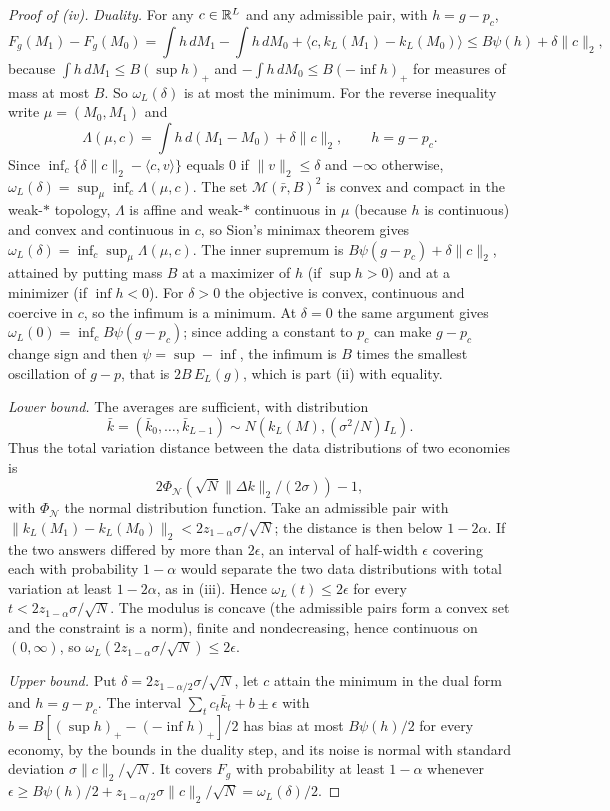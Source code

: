 \begin{proof}[Proof of (iv)]
\emph{Duality.} For any $c\in\mathbb{R}^L$ and any admissible pair, with $h=g-p_c$,
\[
F_g(M_1)-F_g(M_0)=\int h\,dM_1-\int h\,dM_0+\langle c,k_L(M_1)-k_L(M_0)\rangle\le B\psi(h)+\delta\|c\|_2,
\]
because $\int h\,dM_1\le B(\sup h)_+$ and $-\int h\,dM_0\le B(-\inf h)_+$ for measures of mass at most $B$. So $\omega_L(\delta)$ is at most the minimum. For the reverse inequality write $\mu=(M_0,M_1)$ and
\[
\Lambda(\mu,c)=\int h\,d(M_1-M_0)+\delta\|c\|_2,\qquad h=g-p_c .
\]
Since $\inf_c\{\delta\|c\|_2-\langle c,v\rangle\}$ equals $0$ if $\|v\|_2\le\delta$ and $-\infty$ otherwise, $\omega_L(\delta)=\sup_\mu\inf_c\Lambda(\mu,c)$. The set $\mathcal M(\bar r,B)^2$ is convex and compact in the weak-$*$ topology, $\Lambda$ is affine and weak-$*$ continuous in $\mu$ (because $h$ is continuous) and convex and continuous in $c$, so Sion's minimax theorem \citep{t:sion1958} gives $\omega_L(\delta)=\inf_c\sup_\mu\Lambda(\mu,c)$. The inner supremum is $B\psi(g-p_c)+\delta\|c\|_2$, attained by putting mass $B$ at a maximizer of $h$ (if $\sup h>0$) and at a minimizer (if $\inf h<0$). For $\delta>0$ the objective is convex, continuous and coercive in $c$, so the infimum is a minimum. At $\delta=0$ the same argument gives $\omega_L(0)=\inf_c B\psi(g-p_c)$; since adding a constant to $p_c$ can make $g-p_c$ change sign and then $\psi=\sup-\inf$, the infimum is $B$ times the smallest oscillation of $g-p$, that is $2B\,E_L(g)$, which is part (ii) with equality.

\emph{Lower bound.} The averages are sufficient, with distribution
\[
\bar k=(\bar k_0,\dots,\bar k_{L-1})\sim N(k_L(M),(\sigma^2/N)I_L).
\]
Thus the total variation distance between the data distributions of two economies is
\[
2\Phi_{\mathcal N}(\sqrt N\|\Delta k\|_2/(2\sigma))-1,
\]
with $\Phi_{\mathcal N}$ the normal distribution function. Take an admissible pair with $\|k_L(M_1)-k_L(M_0)\|_2<2z_{1-\alpha}\sigma/\sqrt N$; the distance is then below $1-2\alpha$. If the two answers differed by more than $2\epsilon$, an interval of half-width $\epsilon$ covering each with probability $1-\alpha$ would separate the two data distributions with total variation at least $1-2\alpha$, as in (iii). Hence $\omega_L(t)\le2\epsilon$ for every $t<2z_{1-\alpha}\sigma/\sqrt N$. The modulus is concave (the admissible pairs form a convex set and the constraint is a norm), finite and nondecreasing, hence continuous on $(0,\infty)$, so $\omega_L(2z_{1-\alpha}\sigma/\sqrt N)\le2\epsilon$.

\emph{Upper bound.} Put $\delta=2z_{1-\alpha/2}\sigma/\sqrt N$, let $c$ attain the minimum in the dual form and $h=g-p_c$. The interval $\sum_tc_t\bar k_t+b\pm\epsilon$ with $b=B[(\sup h)_+-(-\inf h)_+]/2$ has bias at most $B\psi(h)/2$ for every economy, by the bounds in the duality step, and its noise is normal with standard deviation $\sigma\|c\|_2/\sqrt N$. It covers $F_g$ with probability at least $1-\alpha$ whenever $\epsilon\ge B\psi(h)/2+z_{1-\alpha/2}\sigma\|c\|_2/\sqrt N=\omega_L(\delta)/2$.


\end{proof}
